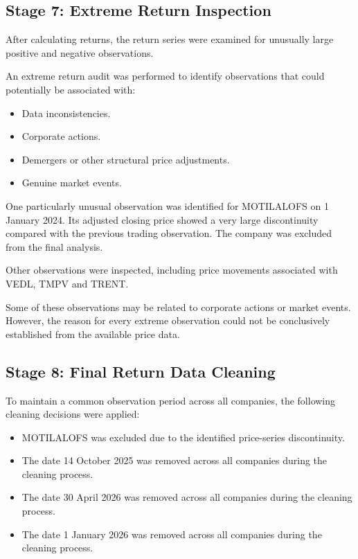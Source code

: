 \documentclass[11pt,a4paper]{article}
\begin{document}
\subsection{Stage 7: Extreme Return Inspection}

After calculating returns, the return series were examined
for unusually large positive and negative observations.

An extreme return audit was performed to identify observations
that could potentially be associated with:

\begin{itemize}
    \item Data inconsistencies.
    \item Corporate actions.
    \item Demergers or other structural price adjustments.
    \item Genuine market events.
\end{itemize}

One particularly unusual observation was identified for
MOTILALOFS on 1 January 2024. Its adjusted closing price
showed a very large discontinuity compared with the previous
trading observation. The company was excluded from the
final analysis.

Other observations were inspected, including price movements
associated with VEDL, TMPV and TRENT.

Some of these observations may be related to corporate
actions or market events. However, the reason for every
extreme observation could not be conclusively established
from the available price data.

\subsection{Stage 8: Final Return Data Cleaning}

To maintain a common observation period across all companies,
the following cleaning decisions were applied:

\begin{itemize}
    \item MOTILALOFS was excluded due to the identified
    price-series discontinuity.

    \item The date 14 October 2025 was removed across all
    companies during the cleaning process.

    \item The date 30 April 2026 was removed across all
    companies during the cleaning process.

    \item The date 1 January 2026 was removed across all
    companies during the cleaning process.
\end{itemize}
\end{document}

